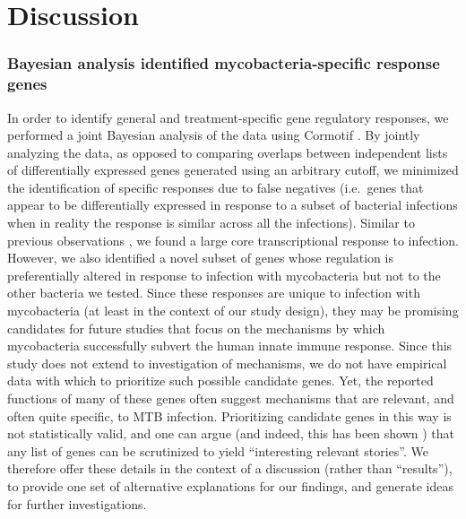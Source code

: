 \section{Discussion}\label{discussion}

\subsubsection{Bayesian analysis identified mycobacteria-specific
response
genes}\label{bayesian-analysis-identified-mycobacteria-specific-response-genes}

In order to identify general and treatment-specific gene regulatory
responses, we performed a joint Bayesian analysis of the data using
Cormotif \citep{Wei2015}. By jointly analyzing the data, as opposed to
comparing overlaps between independent lists of differentially expressed
genes generated using an arbitrary cutoff, we minimized the
identification of specific responses due to false negatives (i.e.~genes
that appear to be differentially expressed in response to a subset of
bacterial infections when in reality the response is similar across all
the infections). Similar to previous observations \citep{Huang2001;
@Boldrick2002}, we found a large core transcriptional response to
infection. However, we also identified a novel subset of genes whose
regulation is preferentially altered in response to infection with
mycobacteria but not to the other bacteria we tested. Since these
responses are unique to infection with mycobacteria (at least in the
context of our study design), they may be promising candidates for
future studies that focus on the mechanisms by which mycobacteria
successfully subvert the human innate immune response. Since this study
does not extend to investigation of mechanisms, we do not have empirical
data with which to prioritize such possible candidate genes. Yet, the
reported functions of many of these genes often suggest mechanisms that
are relevant, and often quite specific, to MTB infection. Prioritizing
candidate genes in this way is not statistically valid, and one can
argue (and indeed, this has been shown \citep{Pavlidis2012}) that any
list of genes can be scrutinized to yield ``interesting relevant
stories''. We therefore offer these details in the context of a
discussion (rather than ``results''), to provide one set of alternative
explanations for our findings, and generate ideas for further
investigations.

